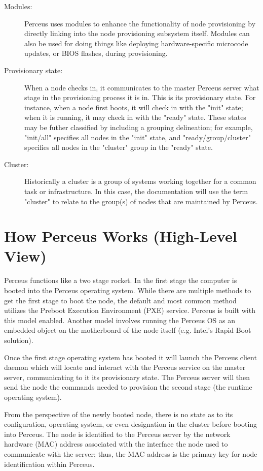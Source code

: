 \documentclass[10pt,letterpaper]{report}
\begin{document}
\begin{description}
\item[Modules:] Perceus uses modules to enhance the functionality of node
provisioning by directly linking into the node provisioning subsystem itself.
Modules can also be used for doing things like deploying hardware-specific
microcode updates, or BIOS flashes, during provisioning.

\item[Provisionary state:] When a node checks in, it communicates to the master
Perceus server what stage in the provisioning process it is in.  This is its
provisionary state.  For instance, when a node first boots, it will check in
with the "init" state; when it is running, it may check in with the "ready"
state.  These states may be futher classified by including a grouping
delineation; for example, "init/all" specifies all nodes in the "init" state,
and "ready/group/cluster" specifies all nodes in the "cluster" group in the
"ready" state.

\item[Cluster:] Historically a cluster is a group of systems working together
for a common task or infrastructure. In this case, the documentation will use
the term "cluster" to relate to the group(s) of nodes that are maintained by
Perceus.

\end{description}

\section{How Perceus Works (High-Level View)}
Perceus functions like a two stage rocket.  In the first stage the computer is
booted into the Perceus operating system.  While there are multiple methods to
get the first stage to boot the node, the default and most common method
utilizes the Preboot Execution Environment (PXE) service.  Perceus is built
with this model enabled.  Another model involves running the Perceus OS as an
embedded object on the motherboard of the node itself (e.g. Intel's Rapid Boot
solution).

Once the first stage operating system has booted it will launch the Perceus
client daemon which will locate and interact with the Perceus service on the
master server, communicating to it its provisionary state. The Perceus server
will then send the node the commands needed to provision the second stage (the
runtime operating system).

From the perspective of the newly booted node, there is no state as to its
configuration, operating system, or even designation in the cluster before
booting into Perceus. The node is identified to the Perceus server by the
network hardware (MAC) address associated with the interface the node used to
communicate with the server; thus, the MAC address is the primary key for node
identification within Perceus.
\end{document}
